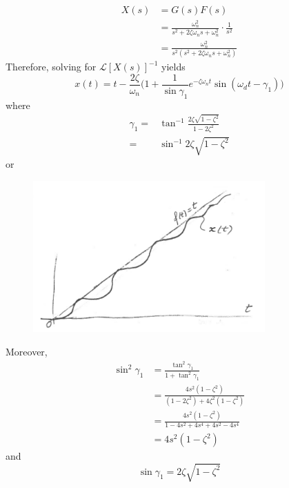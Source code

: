 \documentclass[12pt,letter]{article}
\numberwithin{ex}{section} %
\numberwithin{re}{section} %
\newcommand{\Laplace}[1]{\ensuremath{\mathcal{L}{\left[#1\right]}}}
\numberwithin{equation}{section}	%
\begin{document}
\begin{align}
X(s) &= G(s)F(s) \\
&= \frac{\omega_n^2}{s^2 + 2 \zeta \omega_n s + \omega_n^2} \cdot \frac{1}{s^2}\nonumber \\
&=  \frac{\omega_n^2}{s^2(s^2 + 2 \zeta \omega_n s + \omega_n^2)}
\end{align}
Therefore, solving for $\Laplace{X(s)}^{-1}$ yields
\begin{equation}
x(t) = t - \frac{2 \zeta}{\omega_n} \bigg( 1 + \frac{1}{\sin \gamma_1} e^{-\zeta \omega_n t}  \sin(\omega_dt - \gamma_1) \bigg)
\end{equation}
where
\begin{align}
\gamma_1 =& \tan^{-1} \frac{2 \zeta \sqrt{1-\zeta^2}}{1-2\zeta^2} \\
=& \sin^{-1} 2 \zeta \sqrt{1-\zeta^2}
\end{align}
or
\begin{figure}[H]
	\centering
	\includegraphics[width=3.5in]{../figures/x_t_ramp_time_response_2nd_order}
\end{figure}
Moreover, 
\begin{align}
\sin^2 \gamma_1 &= \frac{\tan^2 \gamma_1}{1 + \tan^2 \gamma_1}\\
 &= \frac{4 s^2 (1-\zeta^2)}{(1 - 2 \zeta^2)+ 4 \zeta^2(1-\zeta^2)} \nonumber \\
 &=  \frac{4 s^2 (1-\zeta^2)}{1-4s^2 + 4s^4 + 4s^2 - 4s^4} \nonumber \\
 &=  4 s^2 (1-\zeta^2) \nonumber
\end{align}
and
\begin{equation}
\sin \gamma_1 = 2 \zeta \sqrt{1-\zeta^2}
\end{equation}
\end{document}
